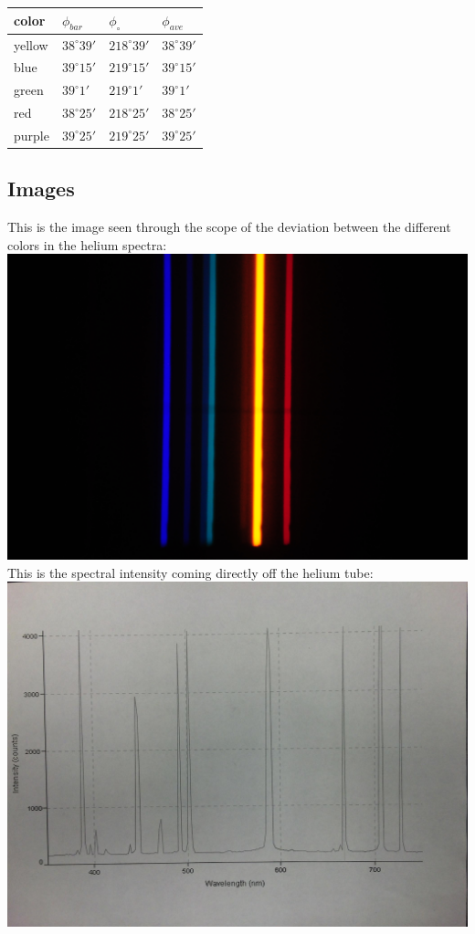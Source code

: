 \documentclass[12pt,a4paper]{article}
\begin{document}
\begin{tabular}{| l | l | l | l |}
\hline
color & $\phi_{bar}$ & $\phi_\circ$ & $\phi_{ave}$\\
\hline
yellow & $38^\circ 39'$ & $218^\circ 39'$ & $38^\circ 39'$\\
\hline
blue & $39^\circ 15'$ & $219^\circ 15'$ & $39^\circ 15'$\\
\hline
green & $39^\circ 1'$ & $219^\circ 1'$ & $39^\circ 1'$\\
\hline
red & $38^\circ 25'$ & $218^\circ 25'$ & $38^\circ 25'$\\
\hline
purple & $39^\circ 25'$ & $219^\circ 25'$ & $39^\circ 25'$\\
\hline


\end{tabular}
\subsection{Images}
This is the image seen through the scope of the deviation between the different colors in the helium spectra:\\
\includegraphics[scale=.3]{hspec}\\
This is the spectral intensity coming directly off the helium tube:\\
\includegraphics[scale=.12]{int}
\end{document}
